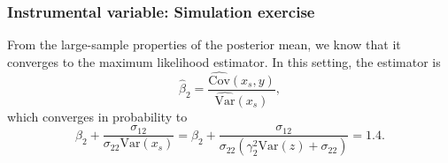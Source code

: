 \documentclass[12pt, compress]{beamer}
\begin{document}
\begin{frame}
	\frametitle{Instrumental variable: Simulation exercise}
From the large-sample properties of the posterior mean, we know that it converges to the maximum likelihood estimator. In this setting, the estimator is 
\[
\hat{\beta}_2 = \frac{\widehat{\mathrm{Cov}}(x_s, y)}{\widehat{\mathrm{Var}}(x_s)},
\]
which converges in probability to 
\[
\beta_2 + \frac{\sigma_{12}}{\sigma_{22}\mathrm{Var}(x_s)} 
= \beta_2 + \frac{\sigma_{12}}{\sigma_{22}(\gamma_2^2 \mathrm{Var}(z) + \sigma_{22})} 
= 1.4.
\]
\end{frame}

%		
	
\end{document}
